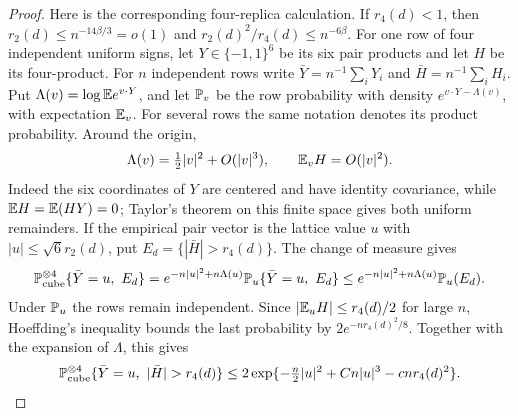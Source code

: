 \begin{proof}
Here is the corresponding four-replica calculation.  If $r_4(d)<1$, then
$r_2(d)\le n^{-14\beta/3}=o(1)$ and
$r_2(d)^2/r_4(d)\le n^{-6\beta}$.  For one row of four independent uniform
signs, let $Y\in\{-1,1\}^6$ be its six pair products and let $H$ be its
four-product.  For $n$ independent rows write
$\bar Y=n^{-1}\sum_iY_i$ and $\bar H=n^{-1}\sum_iH_i$.  Put
$\Lambda(v)=\log\mathbb E e^{v\cdot Y}$, and let $\mathbb P_v$ be the row probability
with density $e^{v\cdot Y-\Lambda(v)}$, with expectation $\mathbb E_v$.  For
several rows the same notation denotes its product probability.  Around the origin,
\[
 \Lambda(v)=\tfrac12|v|^2+O(|v|^3),\qquad
 \mathbb E_v H=O(|v|^2).
\]
Indeed the six coordinates of $Y$ are centered and have identity covariance, while
$\mathbb E H=\mathbb E(HY)=0$; Taylor's theorem on this finite space gives both uniform
remainders.  If the empirical pair vector is the lattice value $u$ with
$|u|\le\sqrt6 r_2(d)$, put $E_d=\{|\bar H|>r_4(d)\}$.  The change of
measure gives
\[
 \mathbb P_{\rm cube}^{\otimes4}\{\bar Y=u,\ E_d\}
 =e^{-n|u|^2+n\Lambda(u)}
       \mathbb P_u\{\bar Y=u,\ E_d\}
 \le e^{-n|u|^2+n\Lambda(u)}\mathbb P_u(E_d).
\]
Under $\mathbb P_u$ the rows remain independent.  Since
$|\mathbb E_uH|\le r_4(d)/2$ for large $n$, Hoeffding's inequality
\cite{Hoeffding1963} bounds the last probability by
$2e^{-nr_4(d)^2/8}$.  Together with the expansion of $\Lambda$, this gives
\begin{equation}\label{hist:cube-quartet}
 \Prob_{\rm cube}^{\otimes4}\{\bar Y=u,\ |\bar H|>r_4(d)\}
 \le 2\exp\{-\tfrac n2|u|^2+Cn|u|^3-cn r_4(d)^2\}.
\end{equation}


\end{proof}
